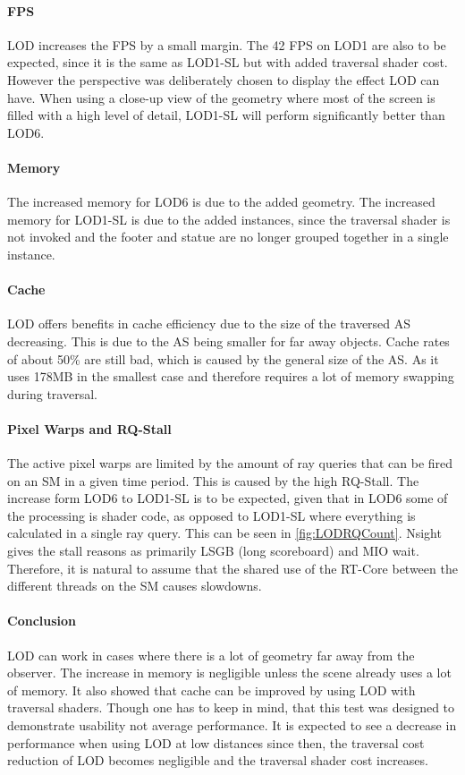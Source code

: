 \paragraph{FPS}
LOD increases the FPS by a small margin. The 42 FPS on LOD1 are also to be expected, since it is the same as LOD1-SL but with added traversal shader cost. However the perspective was deliberately chosen to display the effect LOD can have. When using a close-up view of the geometry where most of the screen is filled with a high level of detail, LOD1-SL will perform significantly better than LOD6.
\paragraph{Memory}
The increased memory for LOD6 is due to the added geometry. The increased memory for LOD1-SL is due to the added instances, since the traversal shader is not invoked and the footer and statue are no longer grouped together in a single instance.
\paragraph{Cache}
LOD offers benefits in cache efficiency due to the size of the traversed AS decreasing. This is due to the AS being smaller for far away objects. Cache rates of about 50\% are still bad, which is caused by the general size of the AS. As it uses 178MB in the smallest case and therefore requires a lot of memory swapping during traversal.
\paragraph{Pixel Warps and RQ-Stall}
The active pixel warps are limited by the amount of ray queries that can be fired on an SM in a given time period. This is caused by the high RQ-Stall. The increase form LOD6 to LOD1-SL is to be expected, given that in LOD6 some of the processing is shader code, as opposed to LOD1-SL where everything is calculated in a single ray query. This can be seen in \ref{fig:LODRQCount}. Nsight gives the stall reasons as primarily LSGB (long scoreboard) and MIO wait. Therefore, it is natural to assume that the shared use of the RT-Core between the different threads on the SM causes slowdowns. \cite{nvdiaCudaGuide}
\paragraph{Conclusion}
LOD can work in cases where there is a lot of geometry far away from the observer. The increase in memory is negligible unless the scene already uses a lot of memory. It also showed that cache can be improved by using LOD with traversal shaders. Though one has to keep in mind, that this test was designed to demonstrate usability not average performance. It is expected to see a decrease in performance when using LOD at low distances since then, the traversal cost reduction of LOD becomes negligible and the traversal shader cost increases.
